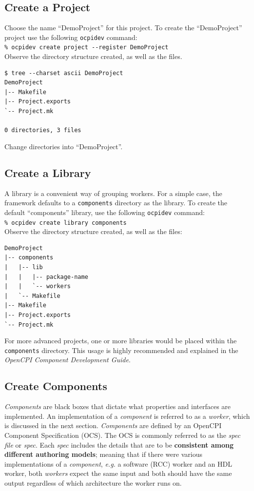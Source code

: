 \subsection{Create a Project}
Choose the name ``DemoProject'' for this project. To create the ``DemoProject'' project use the following \verb+ocpidev+ command:\\

\forceindent\verb+% ocpidev create project --register DemoProject+\\

Observe the directory structure created, as well as the files.\\
\bstart
\begin{verbatim}
$ tree --charset ascii DemoProject
DemoProject
|-- Makefile
|-- Project.exports
`-- Project.mk

0 directories, 3 files
\end{verbatim}
\bend
Change directories into ``DemoProject''.

\subsection{Create a Library}
A library is a convenient way of grouping workers. For a simple case, the framework defaults to a \verb+components+ directory as the library. To create the default ``components'' library, use the following \verb+ocpidev+ command:\\

\forceindent\verb+% ocpidev create library components+\\

\bstart
Observe the directory structure created, as well as the files:
\begin{verbatim}
DemoProject
|-- components
|   |-- lib
|   |   |-- package-name
|   |   `-- workers
|   `-- Makefile
|-- Makefile
|-- Project.exports
`-- Project.mk
\end{verbatim}
\bend
For more advanced projects, one or more libraries would be placed within the \verb+components+ directory. This usage is highly recommended and explained in the \textit{OpenCPI Component Development Guide}.

\subsection{Create Components}
\textit{Components} are black boxes that dictate what properties and interfaces are implemented. An implementation of a \textit{component} is referred to as a \textit{worker}, which is discussed in the next section. \textit{Components} are defined by an OpenCPI Component Specification (OCS). The OCS is commonly referred to as the \textit{spec file} or \textit{spec}. Each \textit{spec} includes the details that are to be \textbf{consistent among different authoring models}; meaning that if there were various implementations of a \textit{component}, \textit{e.g.} a software (RCC) worker and an HDL worker, both \textit{workers} expect the same input and both should have the same output regardless of which architecture the worker runs on.\newline


